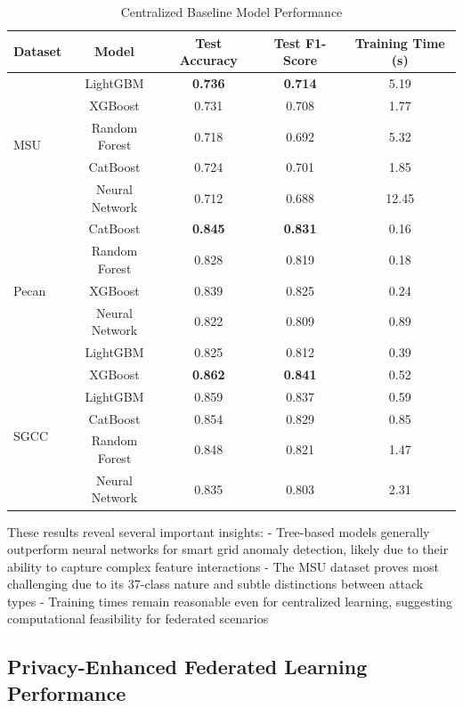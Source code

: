 \documentclass{ieeeaccess}
\theoremstyle{definition}
\begin{document}
\begin{table}[h]
\caption{Centralized Baseline Model Performance}
\label{tab:baseline}
\centering
\begin{tabular}{lcccc}
\toprule
Dataset & Model & Test Accuracy & Test F1-Score & Training Time (s) \\
\midrule
\multirow{5}{*}{MSU} & LightGBM & \textbf{0.736} & \textbf{0.714} & 5.19 \\
                     & XGBoost & 0.731 & 0.708 & 1.77 \\
                     & Random Forest & 0.718 & 0.692 & 5.32 \\
                     & CatBoost & 0.724 & 0.701 & 1.85 \\
                     & Neural Network & 0.712 & 0.688 & 12.45 \\
\midrule
\multirow{5}{*}{Pecan} & CatBoost & \textbf{0.845} & \textbf{0.831} & 0.16 \\
                       & Random Forest & 0.828 & 0.819 & 0.18 \\
                       & XGBoost & 0.839 & 0.825 & 0.24 \\
                       & Neural Network & 0.822 & 0.809 & 0.89 \\
                       & LightGBM & 0.825 & 0.812 & 0.39 \\
\midrule
\multirow{5}{*}{SGCC} & XGBoost & \textbf{0.862} & \textbf{0.841} & 0.52 \\
                      & LightGBM & 0.859 & 0.837 & 0.59 \\
                      & CatBoost & 0.854 & 0.829 & 0.85 \\
                      & Random Forest & 0.848 & 0.821 & 1.47 \\
                      & Neural Network & 0.835 & 0.803 & 2.31 \\
\bottomrule
\end{tabular}
\end{table}

These results reveal several important insights:
- Tree-based models generally outperform neural networks for smart grid anomaly detection, likely due to their ability to capture complex feature interactions
- The MSU dataset proves most challenging due to its 37-class nature and subtle distinctions between attack types
- Training times remain reasonable even for centralized learning, suggesting computational feasibility for federated scenarios

\subsection{Privacy-Enhanced Federated Learning Performance}
\end{document}
